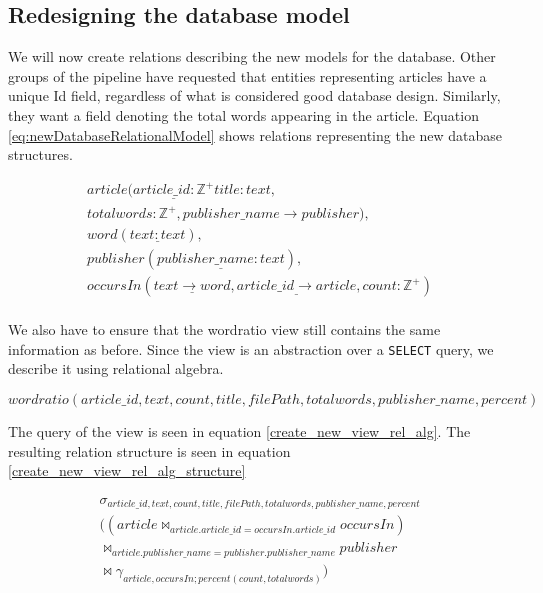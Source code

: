 \subsection{Redesigning the database model}\label{databaseModelRedesignNF}
We will now create relations describing the new models for the database.
Other groups of the \knox{} pipeline have requested that entities representing articles have a unique Id field, regardless of what is considered good database design.
Similarly, they want a field denoting the total words appearing in the article.
Equation \ref{eq:newDatabaseRelationalModel} shows relations representing the new database structures.

\begin{equation}\label{eq:newDatabaseRelationalModel}
    \begin{split}
        article(\underline{article\_id: \mathbb{Z^+}} title:text,\\ totalwords:\mathbb{Z^+}, publisher\_name \rightarrow publisher), \\
        word(\underline{text:text}),\\
        publisher(\underline{publisher\_name:text}),\\
        occursIn(\underline{text \rightarrow word}, \underline{article\_id \rightarrow article}, count:\mathbb{Z^+})\\
    \end{split}
\end{equation}

We also have to ensure that the wordratio view still contains the same information as before.
Since the view is an abstraction over a \texttt{SELECT} query, we describe it using relational algebra. 

\begin{equation}\label{create_new_view_rel_alg_structure}
    wordratio(article\_id, text, count,title, filePath, totalwords, publisher\_name, percent)
\end{equation}

The query of the view is seen in equation \ref{create_new_view_rel_alg}.
The resulting relation structure is seen in equation \ref{create_new_view_rel_alg_structure}

\begin{equation}\label{create_new_view_rel_alg}
    \begin{split}
        \sigma_{article\_id, text, count,title, filePath, totalwords, publisher\_name, percent} \\
        ((article \Join_{article.article\_id = occursIn.article\_id} occursIn) \\
        \Join_{article.publisher\_name = publisher.publisher\_name} publisher\\
        \Join \gamma_{article, occursIn;percent(count, totalwords)})
    \end{split}
\end{equation}

